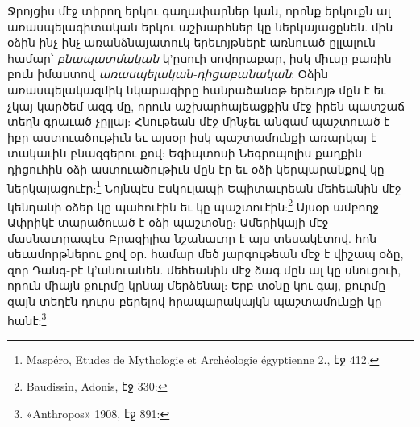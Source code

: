\documentclass{article}
\begin{document}
{Ջրոյցիս մէջ տիրող երկու գաղափարներ կան, որոնք երկուքն ալ առասպելագիտական երկու աշխարհներ կը ներկայացընեն. մին օձին ինչ ինչ առանձնայատուկ երեւոյթներէ առնուած ըլլալուն համար՝ \emph{բնապատմական} կ'ըսուի սովորաբար, իսկ միւսը բառին բուն իմաստով \emph{առասպելական-դիցաբանական}: Օձին առասպելակազմիկ նկարագիրը հանրածանօթ երեւոյթ մըն է եւ չկայ կարծեմ ազգ մը, որուն աշխարհայեացքին մէջ իրեն պատշաճ տեղն գրաւած չըլլայ: Հնութեան մէջ մինչեւ անգամ պաշտուած է իբր աստուածութիւն եւ այսօր իսկ պաշտամունքի առարկայ է տակաւին բնազգերու քով: Եգիպտոսի Նեգրոպոլիս քաղքին դիցուհին օձի աստուածութիւն մըն էր եւ օձի կերպարանքով կը ներկայացուէր:\footnote{Maspéro, Etudes de Mythologie et Archéologie égyptienne 2., էջ 412.} Նոյնպէս Էսկուլապի Եպիտաւրեան մեհեանին մէջ կենդանի օձեր կը պահուէին եւ կը պաշտուէին:\footnote{Baudissin, Adonis, էջ 330:} Այսօր ամբողջ Ափրիկէ տարածուած է օձի պաշտօնը: Ամերիկայի մէջ մասնաւորապէս Բրազիլիա նշանաւոր է այս տեսակէտով. հոն սեւամորթներու քով օր. համար մեծ յարգութեան մէջ է վիշապ օձը, զոր Դանգ-բէ կ'անուանեն. մեհեանին մէջ ձագ մըն ալ կը սնուցուի, որուն միայն քուրմը կրնայ մերձենալ: Երբ տօնը կու գայ, քուրմը զայն տեղէն դուրս բերելով հրապարակայկն պաշտամունքի կը հանէ:\footnote{«Anthropos» 1908, էջ 891:}

}
\end{document}
